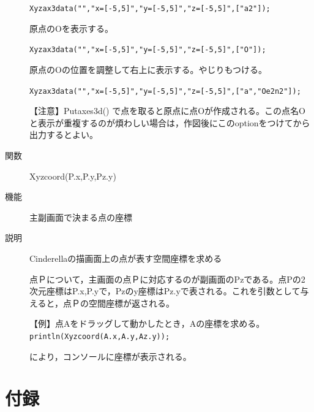 \documentclass[papersize,a4paper,12pt,uplatex]{jsarticle}
\begin{document}
\begin{description}
 \verb|Xyzax3data("","x=[-5,5]","y=[-5,5]","z=[-5,5]",["a2"]);|
  
原点のOを表示する。

 \verb|Xyzax3data("","x=[-5,5]","y=[-5,5]","z=[-5,5]",["O"]);|
 
 原点のOの位置を調整して右上に表示する。やじりもつける。
 
 \verb|Xyzax3data("","x=[-5,5]","y=[-5,5]","z=[-5,5]",["a","Oe2n2"]);|
 

【注意】Putaxes3d() で点を取ると原点に点Oが作成される。この点名Oと表示が重複するのが煩わしい場合は，作図後にこのoptionをつけてから出力するとよい。


\vspace{\baselineskip}
\hypertarget{xyzcoord}{}
\item[関数]  Xyzcoord(P.x,P.y,Pz.y)
\item[機能]  主副画面で決まる点の座標
\item[説明]  Cinderellaの描画面上の点が表す空間座標を求める

  点Ｐについて，主画面の点Ｐに対応するのが副画面のPzである。点Pの2次元座標はP.x,P.yで，Pzのy座標はPz.yで表される。これを引数として与えると，点Ｐの空間座標が返される。
  
\vspace{\baselineskip}
【例】点Aをドラッグして動かしたとき，Aの座標を求める。
\verb|println(Xyzcoord(A.x,A.y,Az.y));|
  
により，コンソールに座標が表示される。

\end{description}
\newpage

\section{付録}
\end{document}
